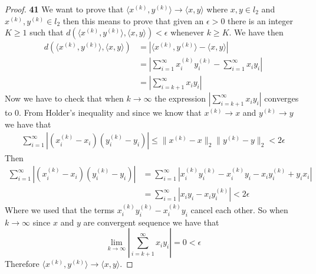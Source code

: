 \documentclass[11pt]{article}
\theoremstyle{definition}
\begin{document}
\cleardoublepage
    \begin{proof}{\textbf{41}}
        We want to prove that $\langle x^{(k)}, y^{(k)}\rangle \to \langle x,y\rangle$
        where $x,y \in l_2$ and $x^{(k)}, y^{(k)} \in l_2$ then this means to prove that
        given an $\epsilon >0$ there is an integer $K \geq 1$ such that
        $d(\langle x^{(k)}, y^{(k)}\rangle, \langle x,y\rangle) < \epsilon$
        whenever $k \geq K$. We have then
        \begin{align*}
            d(\langle x^{(k)}, y^{(k)}\rangle, \langle x, y\rangle) &=
            |\langle x^{(k)}, y^{(k)}\rangle - \langle x, y\rangle|\\
            &= |\sum_{i=1}^\infty x_i^{(k)}y_i^{(k)} - \sum_{i=1}^\infty x_iy_i|\\
            &= |\sum_{i=k+1}^\infty x_iy_i|
        \end{align*}
        Now we have to check that when $k \to \infty$ the expression
        $|\sum_{i=k+1}^\infty x_iy_i|$ converges to 0. From Holder's inequality and
        since we know that $x^{(k)} \to x$ and $y^{(k)} \to y$ we have that
        \begin{align*}
            \sum_{i=1}^{\infty} |(x_i^{(k)} - x_i)(y_i^{(k)} - y_i)| \leq
            \|x^{(k)} - x\|_2\|y^{(k)} - y\|_2 < 2\epsilon
        \end{align*}
        Then
        \begin{align*}
            \sum_{i=1}^{\infty} |(x_i^{(k)} - x_i)(y_i^{(k)} - y_i)| &=
            \sum_{i=1}^{\infty} |x_i^{(k)}y_i^{(k)} - x_i^{(k)}y_i - x_iy_i^{(k)} + y_ix_i|\\
            &= \sum_{i=1}^{\infty} |x_iy_i - x_iy_i^{(k)}| < 2\epsilon
        \end{align*}
        Where we used that the terms $x_i^{(k)}y_i^{(k)} - x_i^{(k)}y_i$ cancel each
        other. So when $k \to \infty$ since $x$ and $y$ are convergent sequence we
        have that
        $$\lim_{k \to \infty}|\sum_{i=k+1}^\infty x_iy_i| = 0 < \epsilon$$
        Therefore $\langle x^{(k)}, y^{(k)}\rangle \to \langle x,y\rangle$.
    \end{proof}
\cleardoublepage
\end{document}

